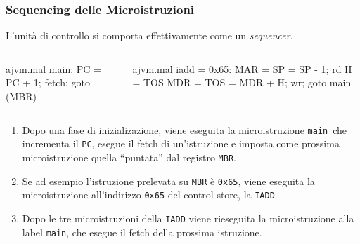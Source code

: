\documentclass{beamer}
\begin{document}
\begin{frame}[fragile]
  \frametitle{Sequencing delle Microistruzioni}
  L'unità di controllo si comporta effettivamente come un \textit{sequencer}.
  \begin{columns}
    \begin{column}{0.5\textwidth}
\begin{myvhdl}{ajvm.mal}
main:
    PC = PC + 1; fetch; goto (MBR)
\end{myvhdl}
\end{column}
\begin{column}{0.5\textwidth}
\begin{myvhdl}{ajvm.mal}
iadd = 0x65:
    MAR = SP = SP - 1; rd
    H = TOS
    MDR = TOS = MDR + H; wr; goto main
\end{myvhdl}
\end{column}
\end{columns}
\begin{enumerate}
  \item Dopo una fase di inizializazione, viene eseguita la microistruzione
  \lstinline{main} che incrementa il \lstinline{PC}, esegue il fetch di
  un'istruzione e imposta come prossima microistruzione quella ``puntata'' dal
  registro \lstinline{MBR}.
  \item Se ad esempio l'istruzione prelevata su \lstinline{MBR} è
  \lstinline{0x65}, viene eseguita la microistruzione all'indirizzo
  \lstinline{0x65} del control store, la \lstinline{IADD}.
  \item Dopo le tre microistruzioni della \lstinline{IADD} viene rieseguita la
  microistruzione alla label \lstinline{main}, che esegue il fetch della
  prossima istruzione.
\end{enumerate}
\end{frame}
\end{document}
